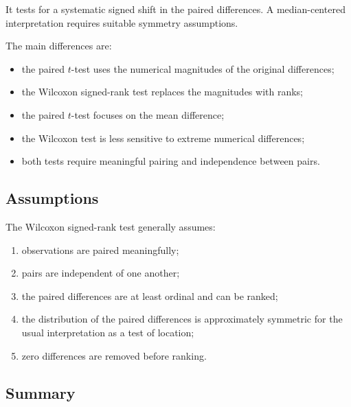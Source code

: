 \documentclass[11pt]{article}
\begin{document}
It tests for a systematic signed shift in the paired differences. A
median-centered interpretation requires suitable symmetry assumptions.

The main differences are:

\begin{itemize}[noitemsep]
    \item the paired \(t\)-test uses the numerical magnitudes of the
    original differences;

    \item the Wilcoxon signed-rank test replaces the magnitudes with
    ranks;

    \item the paired \(t\)-test focuses on the mean difference;

    \item the Wilcoxon test is less sensitive to extreme numerical
    differences;

    \item both tests require meaningful pairing and independence between
    pairs.
\end{itemize}

\subsection{Assumptions}

The Wilcoxon signed-rank test generally assumes:

\begin{enumerate}[noitemsep]
    \item observations are paired meaningfully;

    \item pairs are independent of one another;

    \item the paired differences are at least ordinal and can be ranked;

    \item the distribution of the paired differences is approximately
    symmetric for the usual interpretation as a test of location;

    \item zero differences are removed before ranking.
\end{enumerate}

\subsection{Summary}
\end{document}
